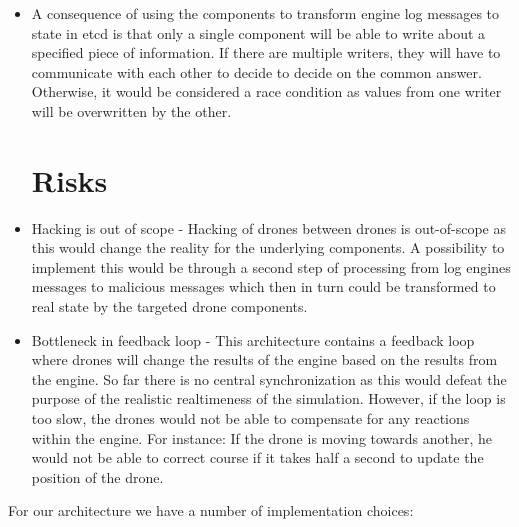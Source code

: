 \documentclass{article}
\begin{document}
\begin{itemize}
\item A consequence of using the components to transform engine log messages to state in etcd is that only a single component will be able to write about a specified piece of information. If there are multiple writers, they will have to communicate with each other to decide to decide on the common answer. Otherwise, it would be considered a race condition as values from one writer will be overwritten by the other.


\section{Risks}
\item Hacking is out of scope - Hacking of drones between drones is out-of-scope as this would change the reality for the underlying components. A possibility to implement this would be through a second step of processing from log engines messages to malicious messages which then in turn could be transformed to real state by the targeted drone components.

\item Bottleneck in feedback loop - This architecture contains a feedback loop where drones will change the results of the engine based on the results from the engine. So far there is no central synchronization as this would defeat the purpose of the realistic realtimeness of the simulation. However, if the loop is too slow, the drones would not be able to compensate for any reactions within the engine. For instance: If the drone is moving towards another, he would not be able to correct course if it takes half a second to update the position of the drone.

\end{itemize}

For our architecture we have a number of implementation choices:
\end{document}
